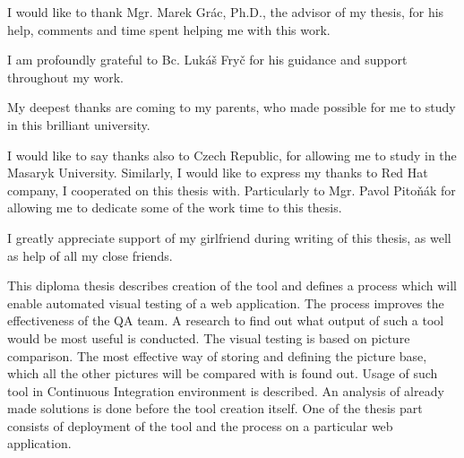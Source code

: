 \documentclass[11pt,oneside,final]{fithesis2}
\begin{document}
\newenvironment{atribut_description}
{\begin{description}
  \renewcommand{\makelabel}[1]{\texttt{\hspace{6pt}##1 $-$}}%
  \setlength{\itemsep}{1pt}
  \setlength{\parskip}{0pt}
  \setlength{\parsep}{0pt}}
{\end{description}}
\renewcommand{\tiny}{\fontsize{7.7}{9.7}\selectfont}

\FrontMatter
\ThesisTitlePage

\begin{ThesisDeclaration}
\DeclarationText
\AdvisorName
\end{ThesisDeclaration}

\begin{ThesisThanks}
I would like to thank Mgr. Marek Grác, Ph.D., the advisor of my thesis, for his help, comments and time spent helping me with this work.

I am profoundly grateful to Bc. Lukáš Fryč for his guidance and support throughout my work.

My deepest thanks are coming to my parents, who made possible for me to study in this brilliant university. 

I would like to say thanks also to Czech Republic, for allowing me to study in the Masaryk University. Similarly, I would like to express
my thanks to Red Hat company, I cooperated on this thesis with. Particularly to Mgr. Pavol Pitoňák for allowing me to dedicate some of the
work time to this thesis.

I greatly appreciate support of my girlfriend during writing of this thesis, as well as help of all my close friends.

\end{ThesisThanks}

\begin{ThesisAbstract}
This diploma thesis describes creation of the tool and defines a process which will enable automated visual testing of a web application. 
The process improves the effectiveness of the QA team. A research to find out what output of such a tool would be most useful is conducted.
The visual testing is based on picture comparison. The most effective way of storing and defining 
the picture base, which all the other pictures will be compared with is found out. 
Usage of such tool in Continuous Integration environment is described. 
An analysis of already made solutions is done before the tool creation itself. 
One of the thesis part consists of deployment of the tool and the process on a particular web application.
\end{ThesisAbstract}
 
\end{document}
